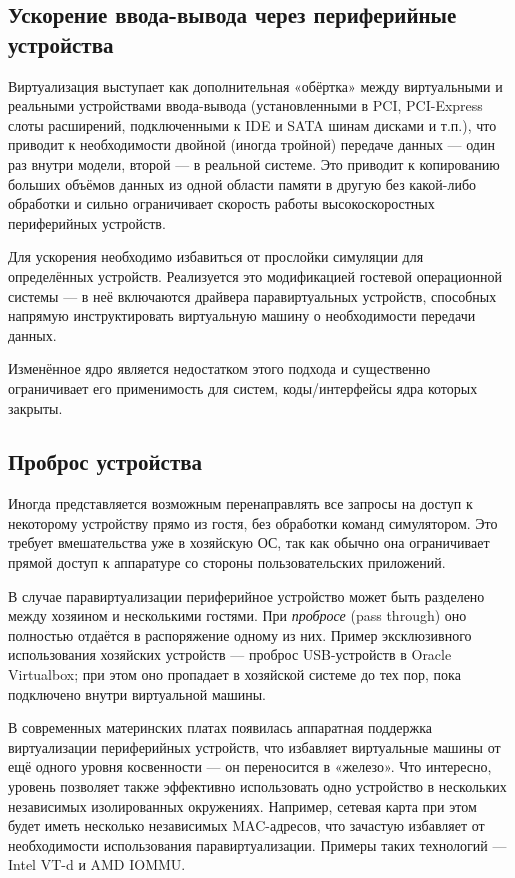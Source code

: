 \subsection[Ускорение ввода-вывода]{Ускорение ввода-вывода через периферийные устройства}

Виртуализация выступает как дополнительная «обёртка» между виртуальными и реальными устройствами ввода-вывода (установленными в PCI, PCI-Express слоты расширений, подключенными к IDE и SATA шинам дисками и т.п.), что приводит к необходимости двойной (иногда тройной) передаче данных --- один раз внутри модели, второй --- в реальной системе. Это приводит к копированию больших объёмов данных из одной области памяти в другую без какой-либо обработки и сильно ограничивает скорость работы высокоскоростных периферийных устройств.

Для ускорения необходимо избавиться от прослойки симуляции для определённых устройств. Реализуется это модификацией гостевой операционной системы --- в неё включаются драйвера паравиртуальных устройств, способных напрямую инструктировать виртуальную машину о необходимости передачи данных.

Изменённое ядро является недостатком этого подхода и существенно ограничивает его применимость для систем, коды/интерфейсы ядра которых закрыты.

\subsection{Проброс устройства}

Иногда представляется возможным перенаправлять все запросы на доступ к некоторому устройству прямо из гостя, без обработки команд симулятором. Это требует вмешательства уже в хозяйскую ОС, так как обычно она ограничивает  прямой доступ к аппаратуре со стороны пользовательских приложений.

В случае паравиртуализации периферийное устройство может быть разделено между хозяином и несколькими гостями. При \textit{пробросе} (\abbr pass through) оно полностью отдаётся в распоряжение одному из них. Пример эксклюзивного использования хозяйских устройств --- проброс USB-устройств в Oracle Virtualbox; при этом оно пропадает в хозяйской системе до тех пор, пока подключено внутри виртуальной машины.

В современных материнских платах появилась аппаратная поддержка виртуализации периферийных устройств, что избавляет виртуальные машины от ещё одного уровня косвенности --- он переносится в «железо». Что интересно, уровень позволяет также эффективно использовать одно устройство в нескольких независимых изолированных окружениях. Например, сетевая карта при этом будет иметь несколько независимых MAC-адресов, что зачастую избавляет от необходимости использования паравиртуализации. Примеры таких технологий --- Intel VT-d и AMD IOMMU.

